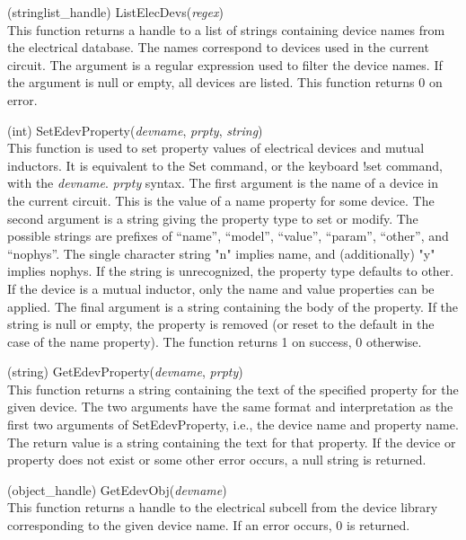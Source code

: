 \begin{description}
\item{(stringlist\_handle) \vt ListElecDevs({\it regex\/})}\\
This function returns a handle to a list of strings containing device
names from the electrical database.  The names correspond to devices
used in the current circuit.  The argument is a regular expression
used to filter the device names.  If the argument is null or empty,
all devices are listed.  This function returns 0 on error.

\item{(int) \vt SetEdevProperty({\it devname}, {\it prpty}, {\it string\/})}\\
This function is used to set property values of electrical devices and
mutual inductors.  It is equivalent to the {\vt Set} command, or the
keyboard {\cb !set} command, with the {\vt \@}{\it devname}.{\it
prpty} syntax.  The first argument is the name of a device in the
current circuit.  This is the value of a {\et name} property for some
device.  The second argument is a string giving the property type to
set or modify.  The possible strings are prefixes of ``{\vt name}'',
``{\vt model}'', ``{\vt value}'', ``{\vt param}'', ``{\vt other}'',
and ``{\vt nophys}''.  The single character string "{\vt n}" implies
{\et name}, and (additionally) "{\vt y}" implies {\et nophys}.  If the
string is unrecognized, the property type defaults to {\et other}.  If
the device is a mutual inductor, only the {\et name} and {\et value}
properties can be applied.  The final argument is a string containing
the body of the property.  If the string is null or empty, the
property is removed (or reset to the default in the case of the {\et
name} property).  The function returns 1 on success, 0 otherwise.

\item{(string) \vt GetEdevProperty({\it devname}, {\it prpty\/})}\\
This function returns a string containing the text of the specified
property for the given device.  The two arguments have the same format
and interpretation as the first two arguments of {\vt
SetEdevProperty}, i.e., the device name and property name.  The return
value is a string containing the text for that property.  If the
device or property does not exist or some other error occurs, a null
string is returned.

\item{(object\_handle) \vt GetEdevObj({\it devname\/})}\\
This function returns a handle to the electrical subcell from the
device library corresponding to the given device name.  If an error
occurs, 0 is returned.

\end{description}


